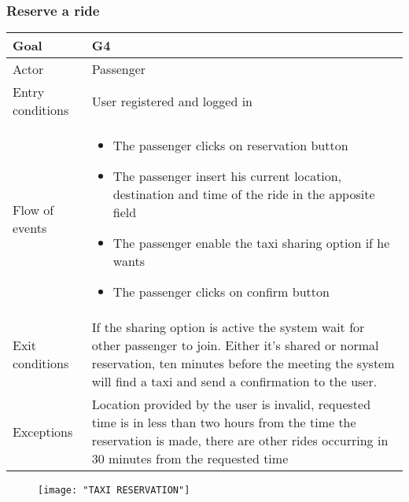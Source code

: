 \subsubsection{Reserve a ride}
\begin {tabular} {|p{3cm}|p{10cm}|}
\hline
Goal & G4\\
\hline
Actor & Passenger\\
\hline
Entry conditions & User registered and logged in\\
\hline
Flow of events &
\begin {itemize}
\item The passenger clicks on reservation button
\item The passenger insert his current location, destination and time of the ride in the apposite field
\item The passenger enable the taxi sharing option if he wants
\item The passenger clicks on confirm button
\end {itemize}\\
\hline
Exit conditions & If the sharing option is active the system wait for other passenger to join.
Either it's shared or normal reservation, ten minutes before the meeting the system will find a taxi and send a confirmation to the user.\\
\hline
Exceptions & Location provided by the user is invalid, requested time is in less than two hours from the time the reservation is made, there are other rides occurring in 30 minutes from the requested time\\
\hline
\end {tabular}
\newpage
\begin{figure}[h!]
	\centering
	\texttt{[image: "TAXI RESERVATION"]}
\end{figure}
\newpage


